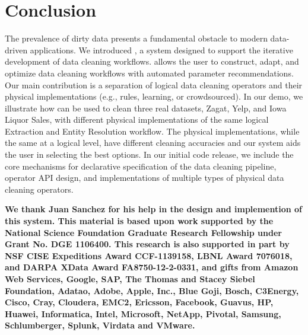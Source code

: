 \section{Conclusion}
The prevalence of dirty data presents a fundamental obstacle to modern data-driven applications.
We introduced \sys, a system designed to support the iterative development of data cleaning workflows.
\sys allows the user to construct, adapt, and optimize data cleaning workflows with automated parameter recommendations.
Our main contribution is a separation of logical data cleaning operators and their physical implementations (e.g., rules, learning, or crowdsourced).
In our demo, we illustrate how \sys can be used to clean three real datasets, Zagat, Yelp, and Iowa Liquor Sales, with different physical implementations of the same logical Extraction and Entity Resolution workflow.
The physical implementations, while the same at a logical level, have different cleaning accuracies and our system aids the user in selecting the best options.
In our initial code release, we include the core mechanisms for declarative specification of the data cleaning pipeline, operator API design, and implementations of multiple types of physical data cleaning operators.

\vspace{0.5em}

\scriptsize\textbf{We thank Juan Sanchez for his help in the design and implemention of this system. This material is based upon work supported by the National Science Foundation Graduate Research Fellowship under Grant No. DGE 1106400. This research is also supported in part by NSF CISE Expeditions Award CCF-1139158, LBNL Award 7076018, and DARPA XData Award FA8750-12-2-0331, and gifts from Amazon Web Services, Google, SAP, The Thomas and Stacey Siebel Foundation, Adatao, Adobe, Apple, Inc., Blue Goji, Bosch, C3Energy, Cisco, Cray, Cloudera, EMC2, Ericsson, Facebook, Guavus, HP, Huawei, Informatica, Intel, Microsoft, NetApp, Pivotal, Samsung, Schlumberger, Splunk, Virdata and VMware.}